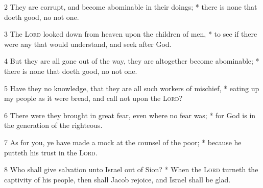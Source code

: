 2 They are corrupt, and become abominable in their doings; * there is none that doeth good, no not one.\par
3 The \textsc{Lord} looked down from heaven upon the children of men, * to see if there were any that would understand, and seek after God.\par
4 But they are all gone out of the way, they are altogether become abominable; * there is none that doeth good, no not one.\par
5 Have they no knowledge, that they are all such workers of mischief, * eating up my people as it were bread, and call not upon the {\textsc{Lord}}?\par
6 There were they brought in great fear, even where no fear was; * for God is in the generation of the righteous.\par
7 As for you, ye have made a mock at the counsel of the poor; * because he putteth his trust in the {\textsc{Lord}}.\par
8 Who shall give salvation unto Israel out of Sion? * When the {\textsc{Lord}} turneth the captivity of his people, then shall Jacob rejoice, and Israel shall be glad.
